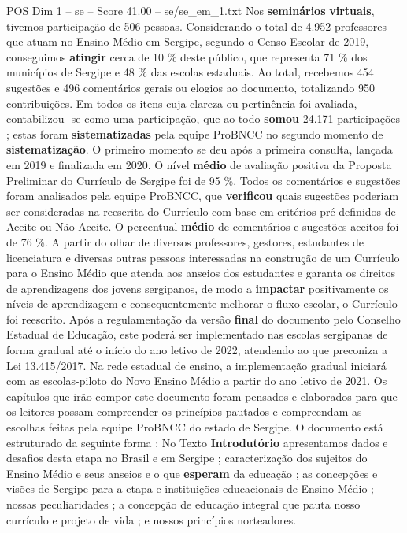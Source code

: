 \begin{textsample}{POS Dim 1 – se – Score 41.00 – se/se\_em\_1.txt}
Nos \textbf{seminários} \textbf{virtuais}, tivemos participação de 506 pessoas.
Considerando o total de 4.952 professores que atuam no Ensino Médio em Sergipe, segundo o Censo Escolar de 2019, conseguimos \textbf{atingir} cerca de 10 \% deste público, que representa 71 \% dos municípios de Sergipe e 48 \% das escolas estaduais.
Ao total, recebemos 454 sugestões e 496 comentários gerais ou elogios ao documento, totalizando 950 contribuições.
Em todos os itens cuja clareza ou pertinência foi avaliada, contabilizou -se como uma participação, que ao todo \textbf{somou} 24.171 participações ; estas foram \textbf{sistematizadas} pela equipe ProBNCC no segundo momento de \textbf{sistematização}.
O primeiro momento se deu após a primeira consulta, lançada em 2019 e finalizada em 2020.
O nível \textbf{médio} de avaliação positiva da Proposta Preliminar do Currículo de Sergipe foi de 95 \%.
Todos os comentários e sugestões foram analisados pela equipe ProBNCC, que \textbf{verificou} quais sugestões poderiam ser consideradas na reescrita do Currículo com base em critérios pré-definidos de Aceite ou Não Aceite.
O percentual \textbf{médio} de comentários e sugestões aceitos foi de 76 \%.
A partir do olhar de diversos professores, gestores, estudantes de licenciatura e diversas outras pessoas interessadas na construção de um Currículo para o Ensino Médio que atenda aos anseios dos estudantes e garanta os direitos de aprendizagens dos jovens sergipanos, de modo a \textbf{impactar} positivamente os níveis de aprendizagem e consequentemente melhorar o fluxo escolar, o Currículo foi reescrito.
Após a regulamentação da versão \textbf{final} do documento pelo Conselho Estadual de Educação, este poderá ser implementado nas escolas sergipanas de forma gradual até o início do ano letivo de 2022, atendendo ao que preconiza a Lei 13.415/2017.
Na rede estadual de ensino, a implementação gradual iniciará com as escolas-piloto do Novo Ensino Médio a partir do ano letivo de 2021.
Os capítulos que irão compor este documento foram pensados e elaborados para que os leitores possam compreender os princípios pautados e compreendam as escolhas feitas pela equipe ProBNCC do estado de Sergipe.
O documento está estruturado da seguinte forma : No Texto \textbf{Introdutório} apresentamos dados e desafios desta etapa no Brasil e em Sergipe ; caracterização dos sujeitos do Ensino Médio e seus anseios e o que \textbf{esperam} da educação ; as concepções e visões de Sergipe para a etapa e instituições educacionais de Ensino Médio ; nossas peculiaridades ; a concepção de educação integral que pauta nosso currículo e projeto de vida ; e nossos princípios norteadores.

\end{textsample}
